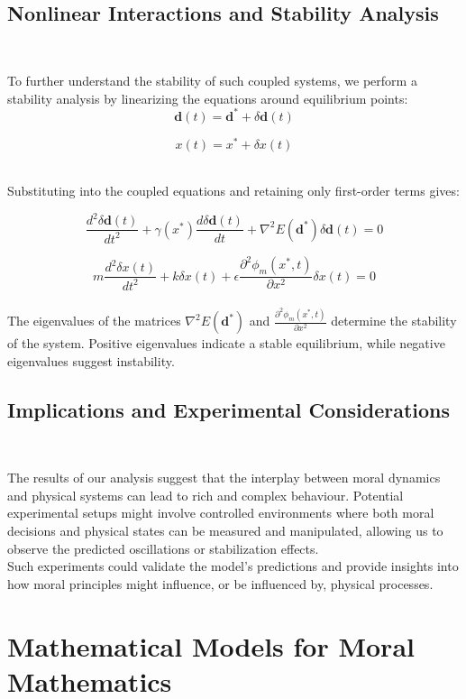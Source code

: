 \documentclass{article}
\begin{document}
\

\
\subsection{Nonlinear Interactions and Stability Analysis}
\

To further understand the stability of such coupled systems, we perform a stability analysis by linearizing the equations around equilibrium points:
\\
\[
\mathbf{d}(t) = \mathbf{d}^* + \delta \mathbf{d}(t)
\]

\[
x(t) = x^* + \delta x(t)
\]
\

Substituting into the coupled equations and retaining only first-order terms gives:

\[
\frac{d^2\delta \mathbf{d}(t)}{dt^2} + \gamma(x^*) \frac{d\delta \mathbf{d}(t)}{dt} + \nabla^2 E(\mathbf{d}^*) \delta \mathbf{d}(t) = 0
\]

\[
m \frac{d^2 \delta x(t)}{dt^2} + k \delta x(t) + \epsilon \frac{\partial^2 \phi_m(x^*, t)}{\partial x^2} \delta x(t) = 0
\]
\
\\

The eigenvalues of the matrices \( \nabla^2 E(\mathbf{d}^*) \) and \( \frac{\partial^2 \phi_m(x^*, t)}{\partial x^2} \) determine the stability of the system. Positive eigenvalues indicate a stable equilibrium, while negative eigenvalues suggest instability.
\\
\subsection{Implications and Experimental Considerations}
\

The results of our analysis suggest that the interplay between moral dynamics and physical systems can lead to rich and complex behaviour. Potential experimental setups might involve controlled environments where both moral decisions and physical states can be measured and manipulated, allowing us to observe the predicted oscillations or stabilization effects.
\\

Such experiments could validate the model's predictions and provide insights into how moral principles might influence, or be influenced by, physical processes.


\section{Mathematical Models for Moral Mathematics}
\
\end{document}
